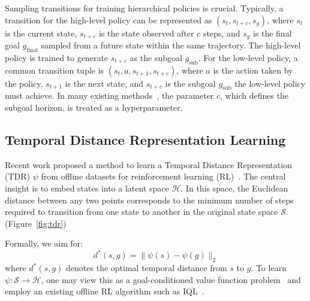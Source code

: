 \documentclass{article}
\begin{document}
Sampling transitions for training hierarchical policies is crucial. Typically, a transition for the high-level policy can be represented as $(s_t, s_{t+c}, s_{g})$, where $s_t$ is the current state, $s_{t+c}$ is the state observed after $c$ steps, and $s_{g}$ is the final goal $g_\text{final}$ sampled from a future state within the same trajectory. The high-level policy is trained to generate $s_{t+c}$ as the subgoal $g_\text{sub}$. For the low-level policy, a common transition tuple is \((s_t, a, s_{t+1}, s_{t+c})\), where $a$ is the action taken by the policy, $s_{t+1}$ is the next state, and \(s_{t+c}\) is the subgoal $g_\text{sub}$ the low-level policy must achieve. In many existing methods~\cite{ajay2021opal, park2023hiql, shin2023guide, li2024boosting, park2024foundation}, the parameter $c$, which defines the subgoal horizon, is treated as a hyperparameter.

\subsection{Temporal Distance Representation Learning}
Recent work proposed a method to learn a Temporal Distance Representation (TDR) \(\psi\) from offline datasets for reinforcement learning (RL)~\cite{park2024foundation}. The central insight is to embed states into a latent space \(\mathcal{H}\). In this space, the Euclidean distance between any two points corresponds to the minimum number of steps required to transition from one state to another in the original state space \(\mathcal{S}\). (Figure~\ref{fig:tdr})

Formally, we aim for:
\begin{equation}
d^*(s, g) =
\bigl\|\psi(s) - \psi(g)\bigr\|_2
\end{equation}
where \(d^*(s, g)\) denotes the optimal temporal distance from \(s\) to \(g\). To learn \(\psi: \mathcal{S} \to \mathcal{H}\), one may view this as a goal-conditioned value function problem~\cite{kaelbling1993learning} and employ an existing offline RL algorithm such as IQL~\cite{kostrikov2022offline, park2023hiql}. 
\end{document}
